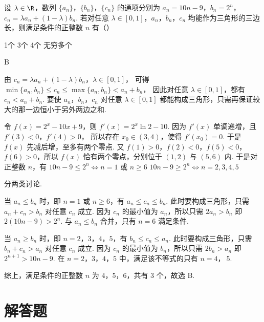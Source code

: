 \documentclass[UTF8,a4paper,oneside,11pt]{ctexbook}
\begin{document}
\begin{problem}
设 \(\lambda\in\R\)，数列 \(\{a_n\}\)，\(\{b_n\}\)，\(\{c_n\}\) 的通项分别为 \(a_n=10n-9\)，\(b_n=2^n\)，\(c_n=\lambda a_n+(1-\lambda)b_n\). 若对任意 \(\lambda\in[0,1]\)，\(a_n\)，\(b_n\)，\(c_n\) 均能作为三角形的三边长，则满足条件的正整数 \(n\) 有（\quad）

\choices
    {1个}
    {3个}
    {4个}
    {无穷多个}
\end{problem}

\begin{answer}
B
\end{answer}

\begin{solution}
由
\(c_n=\lambda a_n+(1-\lambda)b_n\)，\(\lambda\in[0,1]\)，
可得
\(
\min\{a_n,b_n\}\le c_n\le \max\{a_n,b_n\}<a_n+b_n
\)，
因此对任意 \(\lambda\in[0,1]\)，都有 \(c_n<a_n+b_n\).
要使 \(a_n\)，\(b_n\)，\(c_n\) 对任意 \(\lambda\in[0,1]\) 都能构成三角形，只需再保证较大的那一边恒小于另外两边之和.

令 \(f(x)=2^x-10x+9\)，则 \(f'(x)=2^x\ln2-10\). 因为 \(f'(x)\) 单调递增，且 \(f'(3)<0\)，\(f'(4)>0\)，
所以存在 \(x_0\in(3,4)\)，使得 \(f'(x_0)=0\). 于是 \(f(x)\) 先减后增，至多有两个零点.
又 \(f(1)>0\)，\(f(2)<0\)，\(f(5)<0\)，\(f(6)>0\)，所以 \(f(x)\) 恰有两个零点，分别位于 \((1,2)\) 与 \((5,6)\) 内. 于是对正整数 \(n\)，有
\(
10n-9\le 2^n \iff n=1 \text{\ 或\ } n\ge 6
\)
\(
10n-9\ge 2^n \iff n=2,3,4,5
\)

分两类讨论.

当 \(a_n\le b_n\) 时，即 \(n=1\) 或 \(n\ge 6\)，有 \(a_n\le c_n\le b_n\). 此时要构成三角形，只需 \(a_n+c_n>b_n\) 对任意 \(c_n\) 成立. 因为 \(c_n\) 的最小值为 \(a_n\)，所以只需
\(
2a_n>b_n
\)
即 \(2(10n-9)>2^n\). 与 \(a_n\le b_n\) 合并，只有 \(n=6\) 满足条件.

当 \(a_n\ge b_n\) 时，即 \(n=2\)，\(3\)，\(4\)，\(5\)，有 \(b_n\le c_n\le a_n\). 此时要构成三角形，只需 \(b_n+c_n>a_n\) 对任意 \(c_n\) 成立. 因为 \(c_n\) 的最小值为 \(b_n\)，所以只需
\(
2b_n>a_n
\)
即 \(2^{n+1}>10n-9\). 在 \(n=2\)，\(3\)，\(4\)，\(5\) 中，满足该不等式的只有 \(n=4\)，\(\ 5\).

综上，满足条件的正整数 \(n\) 为 \(4\)，\(5\)，\(6\)，共有 \(3\) 个，故选 B.
\end{solution}

\section{解答题}
\end{document}

